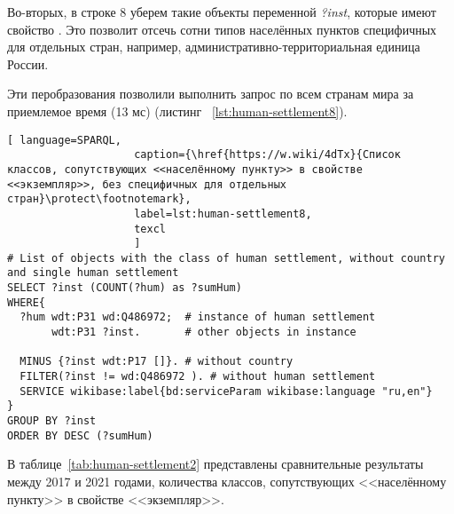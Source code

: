 Во-вторых, в строке \num{8} уберем такие объекты переменной \emph{?inst}, которые имеют свойство . Это позволит отсечь сотни типов населённых пунктов специфичных для отдельных стран, например, административно-территориальная единица России.

Эти перобразования позволили выполнить запрос по всем странам мира за приемлемое время (13 мс) (листинг ~\protect\ref{lst:human-settlement8}).

\lstset{numbers=left, firstnumber=1, frame=single}
\begin{lstlisting}[ language=SPARQL, 
                    caption={\href{https://w.wiki/4dTx}{Cписок классов, сопутствующих <<населённому пункту>> в свойстве <<экземпляр>>, без специфичных для отдельных стран}\protect\footnotemark},
                    label=lst:human-settlement8,
                    texcl 
                    ]
# List of objects with the class of human settlement, without country and single human settlement
SELECT ?inst (COUNT(?hum) as ?sumHum) 
WHERE{ 
  ?hum wdt:P31 wd:Q486972;  # instance of human settlement
       wdt:P31 ?inst.       # other objects in instance
  
  MINUS {?inst wdt:P17 []}. # without country
  FILTER(?inst != wd:Q486972 ). # without human settlement
  SERVICE wikibase:label{bd:serviceParam wikibase:language "ru,en"}
}  
GROUP BY ?inst 
ORDER BY DESC (?sumHum)
\end{lstlisting}%

В таблице~\ref{tab:human-settlement2} представлены сравнительные результаты между 2017  и 2021 годами, количества классов, сопутствующих <<населённому пункту>> в свойстве <<экземпляр>>.

